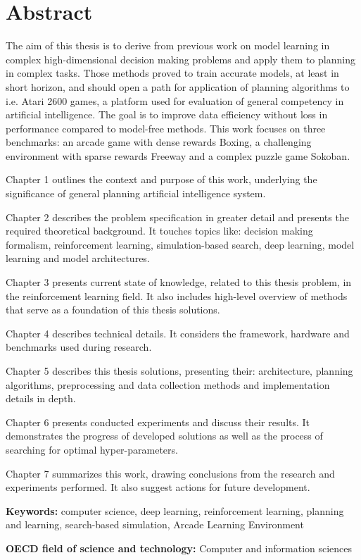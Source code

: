 \section*{Abstract}

The aim of this thesis is to derive from previous work on model learning in complex high-dimensional decision making problems and apply them to planning in complex tasks. Those methods proved to train accurate models, at least in short horizon, and should open a path for application of planning algorithms to i.e. Atari 2600 games, a platform used for evaluation of general competency in artificial intelligence. The goal is to improve data efficiency without loss in performance compared to model-free methods. This work focuses on three benchmarks: an arcade game with dense rewards Boxing, a challenging environment with sparse rewards Freeway and a complex puzzle game Sokoban.

Chapter 1 outlines the context and purpose of this work, underlying the significance of general planning artificial intelligence system. 

Chapter 2 describes the problem specification in greater detail and presents the required theoretical background. It touches topics like: decision making formalism, reinforcement learning, simulation-based search, deep learning, model learning and model architectures.

Chapter 3 presents current state of knowledge, related to this thesis problem, in the reinforcement learning field. It also includes high-level overview of methods that serve as a foundation of this thesis solutions.

Chapter 4 describes technical details. It considers the framework, hardware and benchmarks used during research.

Chapter 5 describes this thesis solutions, presenting their: architecture, planning algorithms, preprocessing and data collection methods and implementation details in depth.

Chapter 6 presents conducted experiments and discuss their results. It demonstrates the progress of developed solutions as well as the process of searching for optimal hyper-parameters.

Chapter 7 summarizes this work, drawing conclusions from the research and experiments performed. It also suggest actions for future development.

\vspace{1cm}
\noindent
\textbf{Keywords:} computer science, deep learning, reinforcement learning, planning and learning, search-based simulation, Arcade Learning Environment

\vspace{0.5cm}
\noindent
\textbf{OECD field of science and technology:} Computer and information sciences
